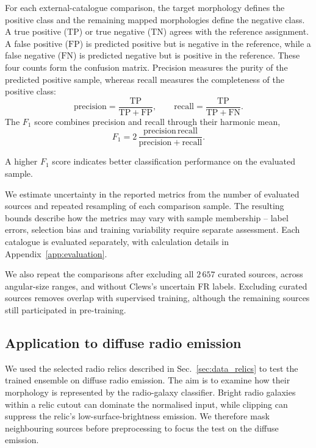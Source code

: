 For each external-catalogue comparison, the target morphology defines the positive class and the remaining mapped morphologies define the negative class.
A true positive (\(\mathrm{TP}\)) or true negative (\(\mathrm{TN}\)) agrees with the reference assignment. 
A false positive (\(\mathrm{FP}\)) is predicted positive but is negative in the reference, while a false negative (\(\mathrm{FN}\)) is predicted negative but is positive in the reference.
These four counts form the confusion matrix. Precision measures the purity of the predicted positive sample, whereas recall measures the completeness of the positive class:
\begin{equation}
\mathrm{precision}=\frac{\mathrm{TP}}{\mathrm{TP}+\mathrm{FP}},\qquad
\mathrm{recall}=\frac{\mathrm{TP}}{\mathrm{TP}+\mathrm{FN}}.
\end{equation}
The \(F_1\) score combines precision and recall through their harmonic mean,
\begin{equation}
F_1=2\,\frac{\mathrm{precision}\,\mathrm{recall}}{\mathrm{precision}+\mathrm{recall}}.
\end{equation}

A higher \(F_1\) score indicates better classification performance on the evaluated sample.

We estimate uncertainty in the reported metrics from the number of evaluated sources and repeated resampling of each comparison sample. The resulting bounds describe how the metrics may vary with sample membership -- label errors, selection bias and training variability require separate assessment.
Each catalogue is evaluated separately, with calculation details in Appendix~\ref{app:evaluation}.

We also repeat the comparisons after excluding all \(2\,657\) curated sources, across angular-size ranges, and without Clews's uncertain FR labels. Excluding curated sources removes overlap with supervised training, although the remaining sources still participated in pre-training.

\subsection{Application to diffuse radio emission}
\label{sec:method_relics}

We used the selected radio relics described in Sec.~\ref{sec:data_relics} to test the trained ensemble on diffuse radio emission.
The aim is to examine how their morphology is represented by the radio-galaxy classifier. 
Bright radio galaxies within a relic cutout can dominate the normalised input, while clipping can suppress the relic's low-surface-brightness emission.
We therefore mask neighbouring sources before preprocessing to focus the test on the diffuse emission.

